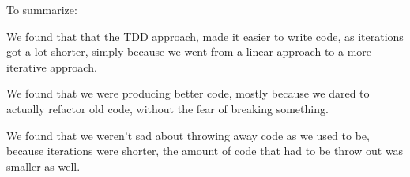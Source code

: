 To summarize:
 
We found that that the TDD approach, made it easier to write code, as iterations
got a lot shorter, simply because we went from a linear approach to a more
iterative approach.
 
We found that we were producing better code, mostly because we dared to
actually refactor old code, without the fear of breaking something.
 
We found that we weren't sad about throwing away code as we used to be, because
iterations were shorter, the amount of code that had to be throw out was smaller
as well. \\
